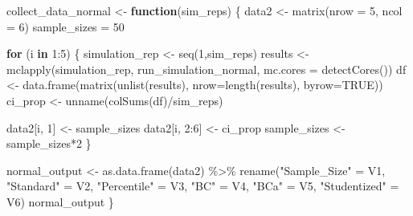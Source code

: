 \documentclass[12pt]{article}
\newenvironment{Shaded}{\begin{snugshade}}{\end{snugshade}}
\newcommand{\AttributeTok}[1]{\textcolor[rgb]{0.77,0.63,0.00}{#1}}
\newcommand{\ConstantTok}[1]{\textcolor[rgb]{0.00,0.00,0.00}{#1}}
\newcommand{\ControlFlowTok}[1]{\textcolor[rgb]{0.13,0.29,0.53}{\textbf{#1}}}
\newcommand{\DecValTok}[1]{\textcolor[rgb]{0.00,0.00,0.81}{#1}}
\newcommand{\FunctionTok}[1]{\textcolor[rgb]{0.00,0.00,0.00}{#1}}
\newcommand{\NormalTok}[1]{#1}
\newcommand{\OtherTok}[1]{\textcolor[rgb]{0.56,0.35,0.01}{#1}}
\newcommand{\SpecialCharTok}[1]{\textcolor[rgb]{0.00,0.00,0.00}{#1}}
\newcommand{\StringTok}[1]{\textcolor[rgb]{0.31,0.60,0.02}{#1}}
\begin{document}
\begin{Shaded}
\begin{Highlighting}[]
\NormalTok{collect\_data\_normal }\OtherTok{\textless{}{-}} \ControlFlowTok{function}\NormalTok{(sim\_reps) \{}
\NormalTok{  data2 }\OtherTok{\textless{}{-}} \FunctionTok{matrix}\NormalTok{(}\AttributeTok{nrow =} \DecValTok{5}\NormalTok{, }\AttributeTok{ncol =} \DecValTok{6}\NormalTok{)}
\NormalTok{  sample\_sizes }\OtherTok{=} \DecValTok{50}
  
  \ControlFlowTok{for}\NormalTok{ (i }\ControlFlowTok{in} \DecValTok{1}\SpecialCharTok{:}\DecValTok{5}\NormalTok{) \{}
\NormalTok{    simulation\_rep }\OtherTok{\textless{}{-}} \FunctionTok{seq}\NormalTok{(}\DecValTok{1}\NormalTok{,sim\_reps)}
\NormalTok{    results }\OtherTok{\textless{}{-}} \FunctionTok{mclapply}\NormalTok{(simulation\_rep, run\_simulation\_normal, }
                        \AttributeTok{mc.cores =} \FunctionTok{detectCores}\NormalTok{())}
\NormalTok{    df }\OtherTok{\textless{}{-}} \FunctionTok{data.frame}\NormalTok{(}\FunctionTok{matrix}\NormalTok{(}\FunctionTok{unlist}\NormalTok{(results), }\AttributeTok{nrow=}\FunctionTok{length}\NormalTok{(results), }\AttributeTok{byrow=}\ConstantTok{TRUE}\NormalTok{))}
\NormalTok{    ci\_prop }\OtherTok{\textless{}{-}} \FunctionTok{unname}\NormalTok{(}\FunctionTok{colSums}\NormalTok{(df)}\SpecialCharTok{/}\NormalTok{sim\_reps)}
    
\NormalTok{    data2[i, }\DecValTok{1}\NormalTok{] }\OtherTok{\textless{}{-}}\NormalTok{ sample\_sizes}
\NormalTok{    data2[i, }\DecValTok{2}\SpecialCharTok{:}\DecValTok{6}\NormalTok{] }\OtherTok{\textless{}{-}}\NormalTok{ ci\_prop}
\NormalTok{    sample\_sizes }\OtherTok{\textless{}{-}}\NormalTok{ sample\_sizes}\SpecialCharTok{*}\DecValTok{2}
\NormalTok{  \}}
  
\NormalTok{  normal\_output }\OtherTok{\textless{}{-}} \FunctionTok{as.data.frame}\NormalTok{(data2) }\SpecialCharTok{\%\textgreater{}\%} 
    \FunctionTok{rename}\NormalTok{(}\StringTok{"Sample\_Size"} \OtherTok{=}\NormalTok{ V1, }\StringTok{"Standard"} \OtherTok{=}\NormalTok{ V2, }\StringTok{"Percentile"} \OtherTok{=}\NormalTok{ V3, }\StringTok{"BC"} \OtherTok{=}\NormalTok{ V4, }
           \StringTok{"BCa"} \OtherTok{=}\NormalTok{ V5, }\StringTok{"Studentized"} \OtherTok{=}\NormalTok{ V6) }
\NormalTok{  normal\_output}
\NormalTok{\}}
\end{Highlighting}
\end{Shaded}
\end{document}
